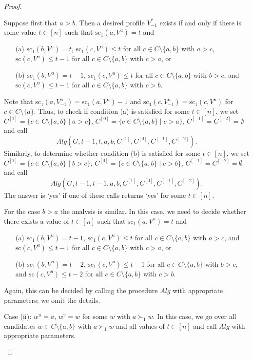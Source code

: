 \documentclass[11pt]{article}
\newcommand{\calA}{\mathit{Alg}}
\newcommand{\scr}{\mathrm{sc}}
\begin{document}
\begin{proof}
\begin{description}
Suppose first that $a > b$. Then a desired profile $V^*_{-1}$ exists if and only if there is some value $t\in[n]$
such that $\scr_1(a, V^u)=t$ and 
\begin{enumerate}
\item[(a)] 
$\scr_1(b, V^u)=t$, $\scr_1(c, V^u)\le t$ for all $c\in C\setminus\{a, b\}$ 
with $a>c$, $\scr(c, V^u)\le t-1$ for all $c\in C\setminus\{a, b\}$ with $c>a$, or
\item[(b)] 
$\scr_1(b, V^u)=t-1$, $\scr_1(c, V^u)\le t$ for all $c\in C\setminus\{a, b\}$
with $b>c$, and $\scr(c, V^u)\le t-1$ for all $c\in C\setminus\{a, b\}$ with $c>b$.
\end{enumerate}
Note that $\scr_1(a, V^u_{-1})=\scr_1(a, V^u) - 1$ and $\scr_1(c, V^u_{-1})=\scr_1(c, V^u)$
for $c\in C\setminus\{a\}$.
Thus, to check if condition (a) is satisfied for some $t\in [n]$, 
we set $C^{[1]} =\{c\in C\setminus\{a, b\}\mid a > c\}$, $C^{[0]} =\{c\in C\setminus\{a, b\}\mid c > a\}$,
$C^{[-1]}=C^{[-2]}=\emptyset$
and call 
$$
\calA(G, t-1, t, a, b, C^{[1]}, C^{[0]}, C^{[-1]}, C^{[-2]}).
$$
Similarly, to determine whether condition (b) is satisfied for some $t\in [n]$, 
we set $C^{[1]} =\{c\in C\setminus\{a, b\}\mid b>c\}$, $C^{[0]} =\{c\in C\setminus\{a, b\}\mid c > b\}$,
$C^{[-1]}=C^{[-2]}=\emptyset$
and call
$$
\calA(G, t-1, t-1, a, b, C^{[1]}, C^{[0]}, C^{[-1]}, C^{[-2]}).
$$
The answer is `yes' if one of these calls returns `yes' for some $t\in [n]$.

For the case $b>a$ the analysis is similar. In this case, we need to decide whether there exists a value of 
$t\in [n]$ such that
$\scr_1(a, V^u)=t$ and 
\begin{itemize}
\item[(a)] 
$\scr_1(b, V^u)=t-1$, $\scr_1(c, V^u)\le t$ for all $c\in C\setminus\{a, b\}$
with $a>c$, and $\scr(c, V^u)\le t-1$ for all $c\in C\setminus\{a, b\}$ with $c>a$, or
\item[(b)] $\scr_1(b, V^u)=t-2$, $\scr_1(c, V^u)\le t-1$ for all $c\in C\setminus\{a, b\}$
with $b>c$, and $\scr(c, V^u)\le t-2$ for all $c\in C\setminus\{a, b\}$ with $c>b$.
\end{itemize}
Again, this can be decided by calling the procedure $\calA$ with appropriate parameters;
we omit the details.

\item
Case (ii): $w^u=a$, $w^v=w$ for some $w$ with $a\succ_1 w$.
In this case, we go over all candidates $w\in C\setminus\{a, b\}$ with $a\succ_1 w$
and all values of $t\in [n]$ and call $\calA$ with appropriate parameters.


\end{description}
\end{proof}
\end{document}
